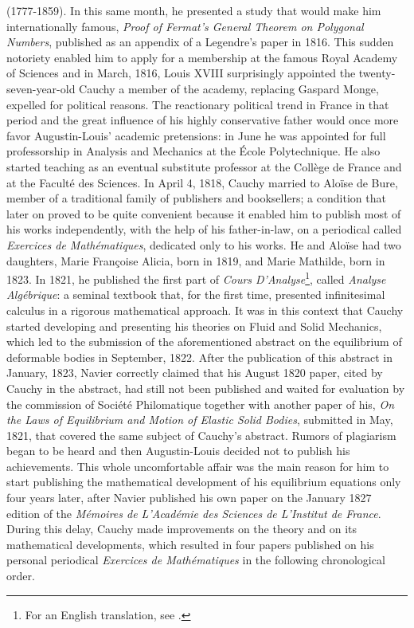 (1777-1859). In this same month, he presented a study that would make him internationally famous, \emph{Proof of Fermat's General Theorem on Polygonal Numbers}, published as an appendix of a Legendre's paper in 1816. This sudden notoriety enabled him to apply for a membership at the famous Royal Academy of Sciences and in March, 1816, Louis XVIII surprisingly appointed the twenty-seven-year-old Cauchy a member of the academy, replacing Gaspard Monge, expelled for political reasons. The reactionary political trend in France in that period and the great influence of his highly conservative father would once more favor Augustin-Louis' academic pretensions: in June he was appointed for full professorship in Analysis and Mechanics at the \'Ecole Polytechnique. He also started teaching as an eventual substitute professor at the Coll\`ege de France and at the Facult\'e des Sciences. In April 4, 1818, Cauchy married to Alo\"ise de Bure, member of a traditional family of publishers and booksellers; a condition that later on proved to be quite convenient because it enabled him to publish most of his works independently, with the help of his father-in-law, on a periodical called \emph{Exercices de Math\'ematiques}, dedicated only to his works. He and Alo\"ise had two daughters, Marie Fran\c{c}oise Alicia, born in 1819, and Marie Mathilde, born in 1823. In 1821, he published the first part of \emph{Cours D'Analyse}\footnote{For an English translation, see \cite{bradley_2009}.}, called \emph{Analyse Alg\'ebrique}: a seminal textbook that, for the first time, presented infinitesimal calculus in a rigorous mathematical approach. It was in this context that Cauchy started developing and presenting his theories on Fluid and Solid Mechanics, which led to the submission of the aforementioned abstract on the equilibrium of deformable bodies in September, 1822. After the publication of this abstract in January, 1823, Navier correctly claimed that his August 1820 paper, cited by Cauchy in the abstract, had still not been published and waited for evaluation by the commission of Soci\'et\'e Philomatique together with another paper of his, \emph{On the Laws of Equilibrium and Motion of Elastic Solid Bodies}, submitted in May, 1821, that covered the same subject of Cauchy's abstract. Rumors of plagiarism began to be heard and then Augustin-Louis decided not to publish his achievements. This whole uncomfortable affair was the main reason for him to start publishing the mathematical development of his equilibrium equations only four years later, after Navier published his own paper on the January 1827 edition of the \emph{M\'emoires de L'Acad\'emie des Sciences de L'Institut de France}. During this delay, Cauchy made improvements on the theory and on its mathematical developments, which resulted in four papers published on his personal periodical \emph{Exercices de Math\'ematiques} in the following chronological order. 

